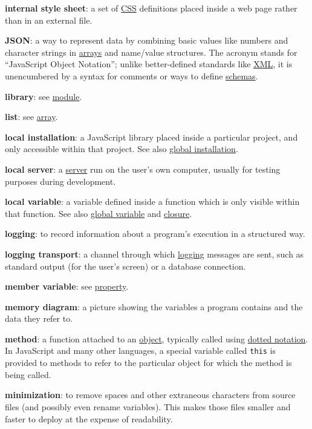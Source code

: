 \textbf{internal style sheet}: a set of \protect\hyperlink{g:css}{CSS}
definitions placed inside a web page rather than in an external file.

\textbf{JSON}: a way to represent data by combining basic values like
numbers and character strings in \protect\hyperlink{g:array}{arrays} and
name/value structures. The acronym stands for ``JavaScript Object
Notation''; unlike better-defined standards like
\protect\hyperlink{g:xml}{XML}, it is unencumbered by a syntax for
comments or ways to define \protect\hyperlink{g:schema}{schemas}.

\textbf{library}: see \protect\hyperlink{g:module}{module}.

\textbf{list}: see \protect\hyperlink{g:array}{array}.

\textbf{local installation}: a JavaScript library placed inside a
particular project, and only accessible within that project. See also
\protect\hyperlink{g:global-installation}{global installation}.

\textbf{local server}: a \protect\hyperlink{g:server}{server} run on the
user's own computer, usually for testing purposes during development.

\textbf{local variable}: a variable defined inside a function which is
only visible within that function. See also
\protect\hyperlink{g:global-variable}{global variable} and
\protect\hyperlink{g:closure}{closure}.

\textbf{logging}: to record information about a program's execution in a
structured way.

\textbf{logging transport}: a channel through which
\protect\hyperlink{g:logging}{logging} messages are sent, such as
standard output (for the user's screen) or a database connection.

\textbf{member variable}: see \protect\hyperlink{g:property}{property}.

\textbf{memory diagram}: a picture showing the variables a program
contains and the data they refer to.

\textbf{method}: a function attached to an
\protect\hyperlink{g:object}{object}, typically called using
\protect\hyperlink{g:dotted-notation}{dotted notation}. In JavaScript
and many other languages, a special variable called \texttt{this} is
provided to methods to refer to the particular object for which the
method is being called.

\textbf{minimization}: to remove spaces and other extraneous characters
from source files (and possibly even rename variables). This makes those
files smaller and faster to deploy at the expense of readability.

